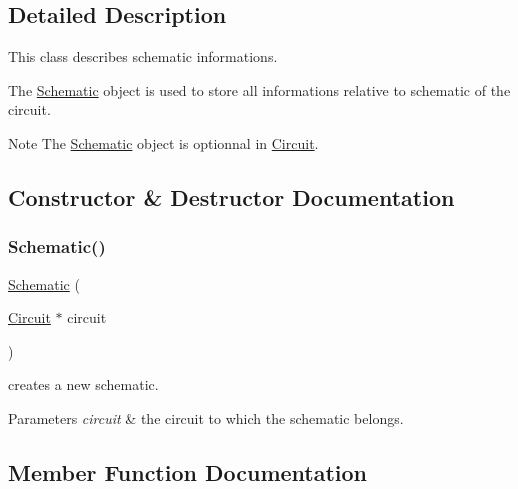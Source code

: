 \subsection{Detailed Description}
This class describes schematic informations.

The \hyperlink{class_open_chams_1_1_schematic}{Schematic} object is used to store all informations relative to schematic of the circuit.

\begin{DoxyNote}{Note}
The \hyperlink{class_open_chams_1_1_schematic}{Schematic} object is optionnal in \hyperlink{class_open_chams_1_1_circuit}{Circuit}. 
\end{DoxyNote}


\subsection{Constructor \& Destructor Documentation}
\mbox{\label{class_open_chams_1_1_schematic_a88d7382ee58bc8d509a8f9b05a57e8b3}} 
\subsubsection{\texorpdfstring{Schematic()}{Schematic()}}
{\footnotesize\ttfamily \hyperlink{class_open_chams_1_1_schematic}{Schematic} (\begin{DoxyParamCaption}\item[{\hyperlink{class_open_chams_1_1_circuit}{Circuit} $\ast$}]{circuit }\end{DoxyParamCaption})}



creates a new schematic. 


\begin{DoxyParams}{Parameters}
{\em circuit} & the circuit to which the schematic belongs. \\
\hline
\end{DoxyParams}


\subsection{Member Function Documentation}
\mbox{\label{class_open_chams_1_1_schematic_ac7fc9f5cdf1e22c53d42e6606e1af8ef}} 
